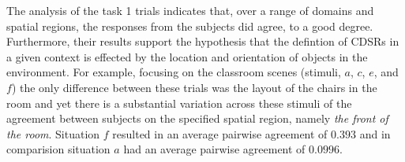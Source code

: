 \documentclass[11pt,letterpaper]{article}
\begin{document}

The analysis of the task 1 trials indicates that, over a range of domains and spatial regions, the responses from the subjects did agree, to a good degree. Furthermore, their results support the hypothesis that the defintion of CDSRs in a given context is effected by the location and orientation of objects in the environment. For example, focusing on the classroom scenes (stimuli, $a$, $c$, $e$, and $f$) the only difference between these trials was the layout of the chairs in the room and yet there is a substantial variation across these stimuli of the agreement between subjects on the specified spatial region, namely \textit{the front of the room}. Situation $f$ resulted in an average pairwise agreement of $0.393$ and in comparision situation $a$ had an average pairwise agreement of $0.0996$. 


\end{document}
